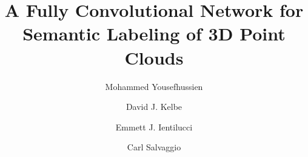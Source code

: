 \documentclass[final,3p,times,twocolumn,authoryear]{elsarticle}
\begin{document}
\begin{frontmatter}



\title{A Fully Convolutional Network for Semantic Labeling of 3D Point Clouds}


\author[add1]{Mohammed Yousefhussien}
\author[add2]{David J. Kelbe}
\author[add1]{Emmett J. Ientilucci}
\author[add1]{Carl Salvaggio}
\address[add1]{Rochester Institute of Technology, Chester F. Carlson Center for Imaging Science, Rochester, NY, USA}
\address[add2]{Oak Ridge National Laboratory, Geographic Information Science and Technology Group, Oak Ridge, TN, USA}


\end{frontmatter}
\end{document}
